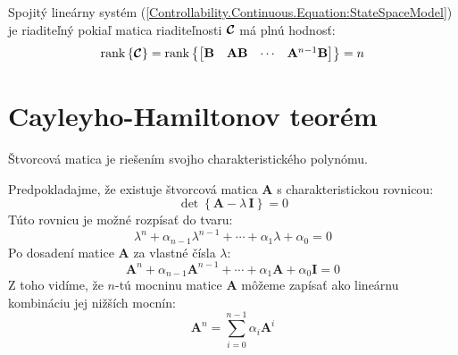 \documentclass[a4paper, 10pt, ]{article}
\begin{document}
\begin{theorem}
    Spojitý lineárny systém (\ref{Controllability.Continuous.Equation:StateSpaceModel}) je riaditeľný pokiaľ matica riaditeľnosti $\boldsymbol{\mathcal{C}}$ má plnú hodnosť:
    \begin{equation}
        \label{Controllability.Continuous.Equation:ControllabilityTheorem}
        \mathrm{rank} \left\{ \boldsymbol{\mathcal{C}} \right\} = 
        \mathrm{rank} \left\{
            \begin{bmatrix}
                \mathbf{B} & \mathbf{A} \mathbf{B} & \cdots & \mathbf{A}^{n - 1} \mathbf{B}
            \end{bmatrix}
        \right\} = 
        n
    \end{equation}
\end{theorem}










\appendix
\section{Cayleyho-Hamiltonov teorém}

\begin{theorem}
    Štvorcová matica je riešením svojho charakteristického polynómu.

    \noindent Predpokladajme, že existuje štvorcová matica $\bm{A}$ s charakteristickou rovnicou:
    \begin{equation}
        \det \left\{ \bm{A} - \lambda \, \bm{I} \right\} = 0
    \end{equation}
    Túto rovnicu je možné rozpísať do tvaru:
    \begin{equation}
        \lambda^n + \alpha_{n - 1} \lambda^{n - 1} + \cdots + \alpha_{1} \lambda + \alpha_{0} = 0
    \end{equation}
    Po dosadení matice $\bm{A}$ za vlastné čísla $\lambda$:
    \begin{equation}
        \bm{A}^n + \alpha_{n - 1} \bm{A}^{n - 1} + \cdots + \alpha_{1} \bm{A} + \alpha_{0} \bm{I} = 0
    \end{equation}
    Z toho vidíme, že $n$-tú mocninu matice $\bm{A}$ môžeme zapísať	ako lineárnu kombináciu jej nižších mocnín:
    \begin{equation}
        \bm{A}^n = \sum_{i = 0}^{n - 1} \alpha_{i} \bm{A}^{i}
    \end{equation}
\end{theorem}
\end{document}
